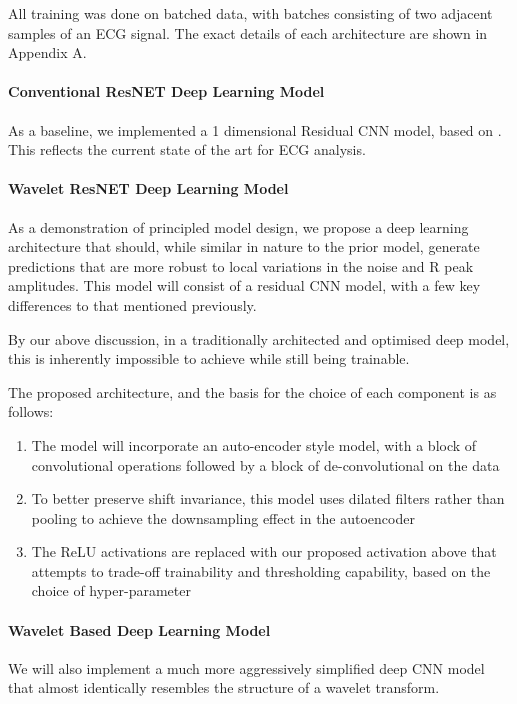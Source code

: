 \documentclass[9pt,conference]{IEEEtran}
\begin{document}
All training was done on batched data, with batches consisting of two adjacent samples of an ECG signal. The exact details of each architecture are shown in Appendix A.


\paragraph{\textbf{Conventional ResNET Deep Learning Model}}
As a baseline, we implemented a 1 dimensional Residual CNN model, based on \cite{stanfordML}. This reflects the current state of the art for ECG analysis.


\paragraph{\textbf{Wavelet ResNET Deep Learning Model}}
As a demonstration of principled model design, we propose a deep learning architecture that should, while similar in nature to the prior model, generate predictions that are more robust to local variations in the noise and R peak amplitudes. This model will consist of a residual CNN model, with a few key differences to that mentioned previously.

By our above discussion, in a traditionally architected and optimised deep model, this is inherently impossible to achieve while still being trainable. 

The proposed architecture, and the basis for the choice of each component is as follows:

\begin{enumerate}
    \item The model will incorporate an auto-encoder style model, with a block of convolutional operations followed by a block of de-convolutional on the data
    \item To better preserve shift invariance, this model uses dilated filters rather than pooling to achieve the downsampling effect in the autoencoder
    \item The ReLU activations are replaced with our proposed activation above that attempts to trade-off  trainability and thresholding capability, based on the choice of hyper-parameter
\end{enumerate}

\paragraph{\textbf{Wavelet Based Deep Learning Model}}

We will also implement a much more aggressively simplified deep CNN model that almost identically resembles the structure of a wavelet transform.
\end{document}
